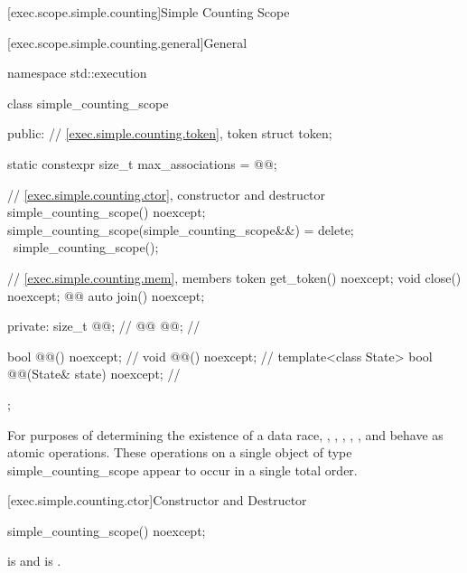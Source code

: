 [exec.scope.simple.counting]{Simple Counting Scope}

[exec.scope.simple.counting.general]{General}

%
\begin{codeblock}
namespace std::execution {
  class simple_counting_scope {
  public:
    // \ref{exec.simple.counting.token}, token
    struct token;

    static constexpr size_t max_associations = @@;

    // \ref{exec.simple.counting.ctor}, constructor and destructor
    simple_counting_scope() noexcept;
    simple_counting_scope(simple_counting_scope&&) = delete;
    ~simple_counting_scope();

    // \ref{exec.simple.counting.mem}, members
    token get_token() noexcept;
    void close() noexcept;
    @@ auto join() noexcept;

  private:
    size_t @@;                                       // \expos
    @@ @@;                             // \expos

    bool @@() noexcept;                      // \expos
    void @@() noexcept;                       // \expos
    template<class State>
      bool @@(State& state) noexcept;    // \expos
  };
}
\end{codeblock}

\pnum
For purposes of determining the existence of a data race,
,
,
,
,
, and
behave as atomic operations.
These operations on a single object of
type simple_counting_scope appear to occur in a single total order.

[exec.simple.counting.ctor]{Constructor and Destructor}

%
\begin{itemdecl}
simple_counting_scope() noexcept;
\end{itemdecl}

\begin{itemdescr}
\pnum
\ensures
{} is  and  is .
\end{itemdescr}


